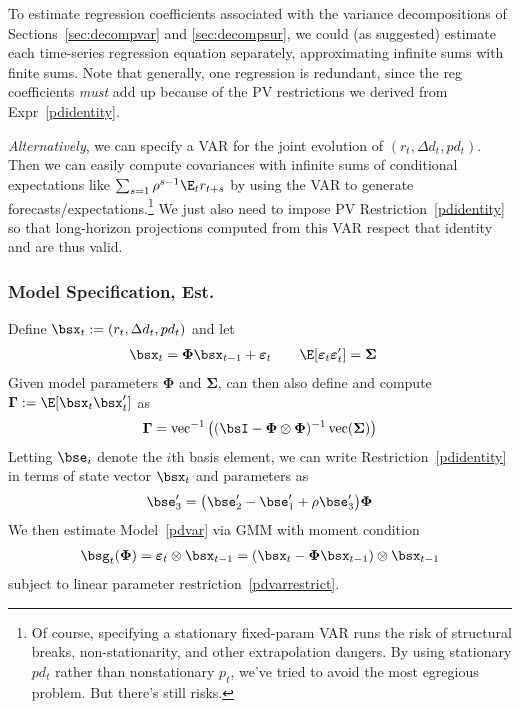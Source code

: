 \documentclass[12pt]{article}
\theoremstyle{plain}
\theoremstyle{definition}
\theoremstyle{remark}
\newcommand{\bsSigma}{\boldsymbol{\Sigma}}
\newcommand{\bsvarepsilon}{\boldsymbol{\varepsilon}}
\newcommand{\bsGamma}{\boldsymbol{\Gamma}}
\newcommand{\bsPhi}{\boldsymbol{\Phi}}
\newcommand{\vc}{\operatorname{vec}}
\begin{document}
\begin{multicols*}{2}
To estimate regression coefficients associated with the variance
decompositions of Sections~\ref{sec:decompvar} and \ref{sec:decompsur},
we could (as suggested) estimate each time-series regression equation
separately, approximating infinite sums with finite sums.
Note that generally, one regression is redundant, since the reg
coefficients \emph{must} add up because of the PV restrictions we
derived from Expr~\ref{pdidentity}.

\emph{Alternatively}, we can specify a VAR for the joint evolution of
$(r_t,\Delta d_t,pd_t)$.
Then we can easily compute covariances with infinite sums of
conditional expectations like $\sum_{s=1}\rho^{s-1}\E_tr_{t+s}$ by using
the VAR to generate forecasts/expectations.\footnote{%
  Of course, specifying a stationary fixed-param VAR runs the risk
  of structural breaks, non-stationarity, and other extrapolation
  dangers. By using stationary $pd_t$ rather than nonstationary $p_t$,
  we've tried to avoid the most egregious problem. But there's still
  risks.
}
We just also need to impose PV Restriction~\ref{pdidentity} so that
long-horizon projections computed from this VAR respect that identity
and are thus valid.


\subsubsection{Model Specification, Est.}

Define $\bsx_t:=(r_t,\Delta d_t,pd_t)$ and let
\begin{align}
  \bsx_t &= \bsPhi \bsx_{t-1} + \bsvarepsilon_t
  \qquad\E[\bsvarepsilon_t\bsvarepsilon_t'] = \bsSigma
  \label{pdvar}
\end{align}
Given model parameters $\bsPhi$ and $\bsSigma$, can then also define and
compute $\bsGamma := \E[\bsx_t\bsx_t']$ as
\begin{align*}
  \bsGamma
  =
  \vc^{-1}\big(
  (\bsI-\bsPhi\otimes\bsPhi)^{-1}
  \vc(\bsSigma)
  \big)
\end{align*}
Letting $\bse_i$ denote the $i$th basis element, we can write
Restriction~\ref{pdidentity} in terms of state vector $\bsx_t$ and
parameters as
\begin{align}
  \bse_3'
  =
  \big(\bse_2' - \bse_1' + \rho\bse_3' \big) \bsPhi
  \label{pdvarrestrict}
\end{align}
We then estimate Model~\ref{pdvar} via GMM with moment condition
\begin{align*}
  \bsg_t(\bsPhi)
  = \bsvarepsilon_t \otimes \bsx_{t-1}
  = (\bsx_t-\bsPhi \bsx_{t-1})\otimes \bsx_{t-1}
\end{align*}
subject to linear parameter restriction~\ref{pdvarrestrict}.



\end{multicols*}
\end{document}
